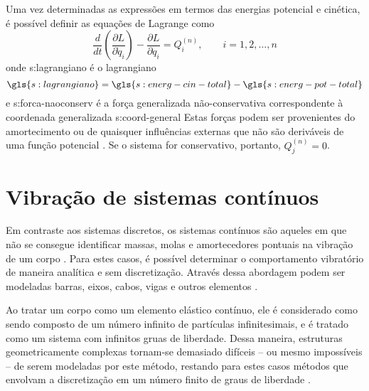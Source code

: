 \documentclass[12pt,openright,oneside,a4paper,
	chapter=TITLE,section=TITLE,
	english,brazil]{abntex2}
\begin{document}
	Uma vez determinadas as expressões em termos das energias potencial e cinética, é possível definir as equações de Lagrange como \cite{savi:2017}
	\begin{equation} \label{eqn:lagrange}
		\frac{d}{dt}\left(\frac{\partial L}{\partial \dot{q}_i}\right) - \frac{\partial L}{\partial q_i} = Q_i^{(n)}, \qquad i = 1, 2, \dots, n
	\end{equation}
	onde \gls{s:lagrangiano} é o lagrangiano
	\begin{equation}
		\gls{s:lagrangiano} = \gls{s:energ-cin-total}-\gls{s:energ-pot-total}
	\end{equation}
	e \gls{s:forca-naoconserv} é a força generalizada não-conservativa correspondente à coordenada generalizada \gls{s:coord-general} Estas forças podem ser provenientes do amortecimento ou de quaisquer influências externas que não são deriváveis de uma função potencial \cite{rao:2008}. Se o sistema for conservativo, portanto, $ Q_j^{(n)} = 0 $.
	
	\section{Vibração de sistemas contínuos}
	Em contraste aos sistemas discretos, os sistemas contínuos são aqueles em que não se consegue identificar massas, molas e amortecedores pontuais na vibração de um corpo \cite{rao:2008}. Para estes casos, é possível determinar o comportamento vibratório de maneira analítica e sem discretização. Através dessa abordagem podem ser modeladas barras, eixos, cabos, vigas e outros elementos \cite{timoshenko:1974}. 
	
	Ao tratar um corpo como um elemento elástico contínuo, ele é considerado como sendo composto de um número infinito de partículas infinitesimais, e é tratado como um sistema com infinitos gruas de liberdade. Dessa maneira, estruturas geometricamente complexas tornam-se demasiado difíceis -- ou mesmo impossíveis -- de serem modeladas por este método, restando para estes casos métodos que envolvam a discretização em um número finito de graus de liberdade \cite{timoshenko:1974}.
	
\end{document}
